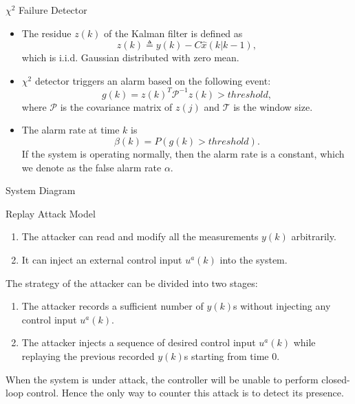 \documentclass[10pt]{beamer}
\newcommand{\tikzdir}[1]{#1.tikz}
\newcommand{\inputtikz}[1]{}}
\begin{document}
  \begin{frame}{$\chi^2$ Failure Detector}
    \begin{itemize}
      \item The residue $z(k)$ of the Kalman filter is defined as
	\begin{displaymath}
	  z(k) \triangleq y(k) - C\hat x(k|k-1),
	\end{displaymath} 
	which is i.i.d. Gaussian distributed with zero mean. 
      \item $\chi^2$ detector triggers an alarm based on the following event:
	\begin{displaymath}
	  g(k)=  z(k)^T\mathcal P^{-1}z(k)> threshold,
	\end{displaymath}
	where $\mathcal P$ is the covariance matrix of $z(j)$ and $\mathcal T$ is the window size.
      \item The alarm rate at time $k$ is 
	\begin{displaymath}
	  \beta(k) = P(g(k) > threshold).
	\end{displaymath}
	If the system is operating normally, then the alarm rate is a constant, which we denote as the false alarm rate $\alpha$.
    \end{itemize}
  \end{frame}

  \begin{frame}{System Diagram}
    \begin{figure}[htpb]
      \begin{center}
	\inputtikz{systemdiagram}
      \end{center}
    \end{figure}
  \end{frame}

  \begin{frame}{Replay Attack Model}
    \begin{enumerate}
      \item The attacker can read and modify all the measurements $y(k)$ arbitrarily.
      \item It can inject an external control input $u^a(k)$ into the system. 
    \end{enumerate}
    The strategy of the attacker can be divided into two stages:
    \begin{enumerate}
      \item The attacker records a sufficient number of $y(k)$s without injecting any control input $u^a(k)$. 
      \item The attacker injects a sequence of desired control input $u^a(k)$ while replaying the previous recorded $y(k)$s starting from time $0$.
    \end{enumerate}
    When the system is under attack, the controller will be unable to perform closed-loop control. Hence the only way to counter this attack is to detect its presence. 
  \end{frame}
\end{document}

